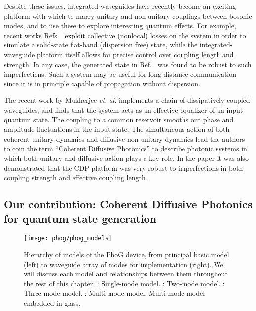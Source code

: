Despite these issues, integrated waveguides have recently become an exciting platform with which to marry unitary and non-unitary couplings between bosonic modes, and to use these to explore interesting quantum effects. For example, recent works Refs.~\cite{Mukherjee2015, Vicencio2015} exploit collective (nonlocal) losses on the system in order to simulate a solid-state flat-band (dispersion free) state, while the integrated-waveguide platform itself allows for precise control over coupling length and strength. In any case, the generated state in Ref.~\cite{Mukherjee2015} was found to be robust to such imperfections. Such a system may be useful for long-distance communication since it is in principle capable of propagation without dispersion.

The recent work by Mukherjee \emph{et. al.} \cite{Mukherjee2017} implements a chain of dissipatively coupled waveguides, and finds that the system acts as an effective equalizer of an input quantum state. The coupling to a common reservoir smooths out phase and amplitude fluctuations in the input state. The simultaneous action of both coherent unitary dynamics and diffusive non-unitary dynamics lead the authors to coin the term ``Coherent Diffusive Photonics'' to describe photonic systems in which both unitary and diffusive action plays a key role. In the paper it was also demonstrated that the CDP platform was very robust to imperfections in both coupling strength and effective coupling length.

\subsection{Our contribution: Coherent Diffusive Photonics for quantum state generation}

\begin{figure}[htp]
\captionsetup{width=0.8\linewidth}
\centering
\texttt{[image: phog/phog\_models]}
\caption{\label{fig:phog_models} Hierarchy of models of the PhoG device, from principal basic model (left) to waveguide array of modes for implementation (right). We will discuss each model and relationships between them throughout the rest of this chapter. \MakeUppercase{}: Single-mode model. \MakeUppercase{}: Two-mode model. \MakeUppercase{}: Three-mode model. \MakeUppercase{}: Multi-mode model. \MakeUppercase{} Multi-mode model embedded in glass. }
\end{figure}

